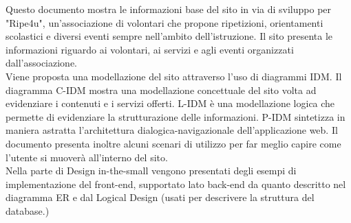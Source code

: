    Questo documento mostra le informazioni base del sito in via di sviluppo per
    "Ripe4u", un'associazione di volontari che propone ripetizioni, orientamenti
    scolastici e diversi eventi sempre nell'ambito dell'istruzione. Il sito
    presenta le informazioni riguardo ai volontari, ai servizi e agli eventi
    organizzati dall'associazione.\\ Viene proposta una modellazione del sito
    attraverso l'uso di diagrammi IDM. Il diagramma C-IDM mostra una
    modellazione concettuale del sito volta ad evidenziare i contenuti e i
    servizi offerti. L-IDM è una modellazione logica che permette di evidenziare
    la strutturazione delle informazioni. P-IDM sintetizza in maniera astratta
    l'architettura dialogica-navigazionale dell'applicazione web. Il documento
    presenta inoltre alcuni scenari di utilizzo per far meglio capire come
    l'utente si muoverà all'interno del sito.\\ Nella parte di Design in-the-small
    vengono presentati degli esempi di implementazione del front-end, supportato
    lato back-end da quanto descritto nel diagramma ER e dal Logical Design
    (usati per descrivere la struttura del database.)
